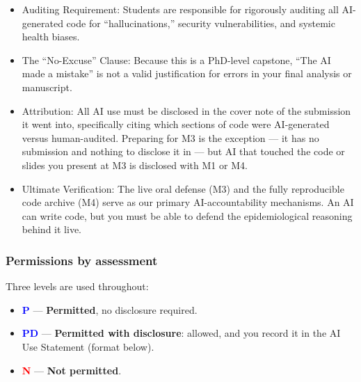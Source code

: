 \documentclass[
]{article}
\providecommand{\tightlist}{%
  \setlength{\itemsep}{0pt}\setlength{\parskip}{0pt}}
\begin{document}
\begin{itemize}
\tightlist
\item
  Auditing Requirement: Students are responsible for rigorously auditing
  all AI-generated code for ``hallucinations,'' security
  vulnerabilities, and systemic health biases.
\item
  The ``No-Excuse'' Clause: Because this is a PhD-level capstone, ``The
  AI made a mistake'' is not a valid justification for errors in your
  final analysis or manuscript.
\item
  Attribution: All AI use must be disclosed in the cover note of the
  submission it went into, specifically citing which sections of code
  were AI-generated versus human-audited. Preparing for M3 is the
  exception --- it has no submission and nothing to disclose it in ---
  but AI that touched the code or slides you present at M3 is disclosed
  with M1 or M4.
\item
  Ultimate Verification: The live oral defense (M3) and the fully
  reproducible code archive (M4) serve as our primary AI-accountability
  mechanisms. An AI can write code, but you must be able to defend the
  epidemiological reasoning behind it live.
\end{itemize}

\subsubsection{Permissions by
assessment}\label{permissions-by-assessment}

Three levels are used throughout:

\begin{itemize}
\tightlist
\item
  \textcolor{blue}{\textbf{P}} --- \textbf{Permitted}, no disclosure
  required.
\item
  \textcolor{blue}{\textbf{PD}} --- \textbf{Permitted with disclosure}:
  allowed, and you record it in the AI Use Statement (format below).
\item
  \textcolor{red}{\textbf{N}} --- \textbf{Not permitted}.
\end{itemize}
\end{document}
